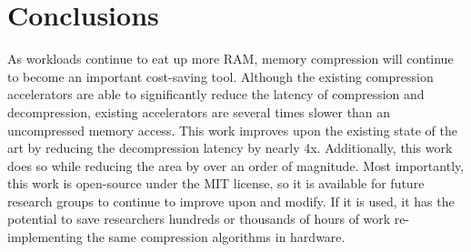 \documentclass[doublespace,nopageskip]{VTthesis}
\begin{document}
\chapter{Conclusions} \label{ch:conclusions}
As workloads continue to eat up more RAM, memory compression will continue to become an important cost-saving tool. Although the existing compression accelerators are able to significantly reduce the latency of compression and decompression, existing accelerators are several times slower than an uncompressed memory access. This work improves upon the existing state of the art by reducing the decompression latency by nearly 4x. Additionally, this work does so while reducing the area by over an order of magnitude. Most importantly, this work is open-source under the MIT license, so it is available for future research groups to continue to improve upon and modify. If it is used, it has the potential to save researchers hundreds or thousands of hours of work re-implementing the same compression algorithms in hardware.


   


\end{document}
